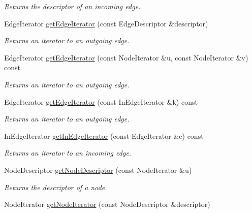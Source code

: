 \begin{DoxyCompactItemize}
\begin{DoxyCompactList}\small\item\em Returns the descriptor of an incoming edge. \item\end{DoxyCompactList}\item 
EdgeIterator \hyperlink{class_dynamic_graph_a0f7fe68985342f5dbba1a5b824f2ac2c}{getEdgeIterator} (const EdgeDescriptor \&descriptor)
\begin{DoxyCompactList}\small\item\em Returns an iterator to an outgoing edge. \item\end{DoxyCompactList}\item 
EdgeIterator \hyperlink{class_dynamic_graph_a6e135b79a187771dfde069b5277b1f88}{getEdgeIterator} (const NodeIterator \&u, const NodeIterator \&v) const 
\begin{DoxyCompactList}\small\item\em Returns an iterator to an outgoing edge. \item\end{DoxyCompactList}\item 
EdgeIterator \hyperlink{class_dynamic_graph_a396484a350c5e3161720e0ce60877214}{getEdgeIterator} (const InEdgeIterator \&k) const 
\begin{DoxyCompactList}\small\item\em Returns an iterator to an outgoing edge. \item\end{DoxyCompactList}\item 
InEdgeIterator \hyperlink{class_dynamic_graph_a35a595f7a88c5a21330f593dcdedad66}{getInEdgeIterator} (const EdgeIterator \&e) const 
\begin{DoxyCompactList}\small\item\em Returns an iterator to an incoming edge. \item\end{DoxyCompactList}\item 
NodeDescriptor \hyperlink{class_dynamic_graph_a12266de606b1d32d76aeb58458d033dd}{getNodeDescriptor} (const NodeIterator \&u)
\begin{DoxyCompactList}\small\item\em Returns the descriptor of a node. \item\end{DoxyCompactList}\item 
NodeIterator \hyperlink{class_dynamic_graph_aa473c6480ec8ac2fa14680c8953b10e0}{getNodeIterator} (const NodeDescriptor \&descriptor)

\end{DoxyCompactItemize}

